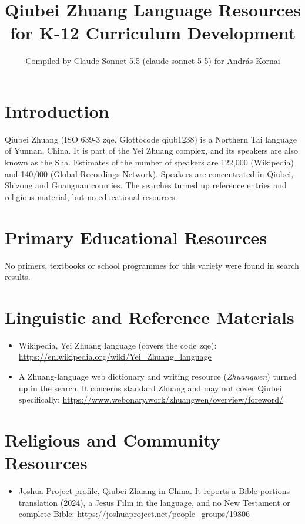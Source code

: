 \documentclass[12pt]{article}
\title{Qiubei Zhuang Language Resources for K-12 Curriculum Development}
\author{Compiled by Claude Sonnet 5.5 (claude-sonnet-5-5) for Andr\'as Kornai}
\date{}
\begin{document}
\maketitle

\section{Introduction}
Qiubei Zhuang (ISO 639-3 zqe, Glottocode qiub1238) is a Northern Tai language of Yunnan, China. It is part of the Yei Zhuang complex, and its speakers are also known as the Sha. Estimates of the number of speakers are 122,000 (Wikipedia) and 140,000 (Global Recordings Network). Speakers are concentrated in Qiubei, Shizong and Guangnan counties. The searches turned up reference entries and religious material, but no educational resources.

\section{Primary Educational Resources}
No primers, textbooks or school programmes for this variety were found in search results.

\section{Linguistic and Reference Materials}
\begin{itemize}
\item Wikipedia, Yei Zhuang language (covers the code zqe): \url{https://en.wikipedia.org/wiki/Yei_Zhuang_language}
\item A Zhuang-language web dictionary and writing resource (\emph{Zhuangwen}) turned up in the search. It concerns standard Zhuang and may not cover Qiubei specifically: \url{https://www.webonary.work/zhuangwen/overview/foreword/}
\end{itemize}

\section{Religious and Community Resources}
\begin{itemize}
\item Joshua Project profile, Qiubei Zhuang in China. It reports a Bible-portions translation (2024), a Jesus Film in the language, and no New Testament or complete Bible: \url{https://joshuaproject.net/people_groups/19806}
\end{itemize}
\end{document}

